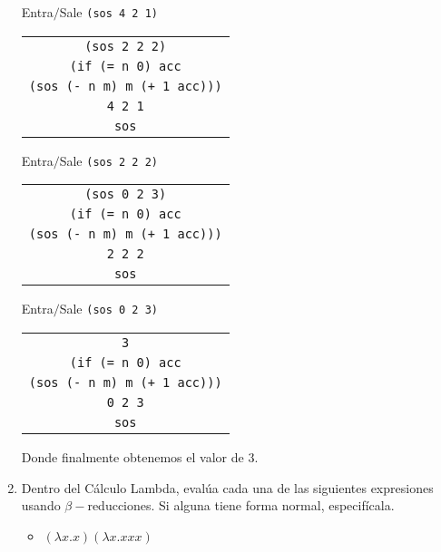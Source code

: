 \documentclass[letterpaper,11pt]{article}
\begin{document}
\begin{enumerate}
    Entra$/$Sale \texttt{(sos 4 2 1)}
    \begin{center}
        \begin{tabular}[h]{|c|}
            \hline
            \texttt{(sos 2 2 2)} \\
            \texttt{(if (= n 0)
                        acc} \\
            \texttt{(sos (- n m) m (+ 1 acc)))} \\ 
            \texttt{4 2 1} \\
            \texttt{sos} \\
            \hline
        \end{tabular}
    \end{center}

    Entra$/$Sale \texttt{(sos 2 2 2)}
    \begin{center}
        \begin{tabular}[h]{|c|}
            \hline
            \texttt{(sos 0 2 3)} \\
            \texttt{(if (= n 0)
                        acc} \\
            \texttt{(sos (- n m) m (+ 1 acc)))} \\ 
            \texttt{2 2 2} \\
            \texttt{sos} \\
            \hline
        \end{tabular}
    \end{center}

    Entra$/$Sale \texttt{(sos 0 2 3)}
    \begin{center}
        \begin{tabular}[h]{|c|}
            \hline
            \texttt{3} \\
            \texttt{(if (= n 0)
                        acc} \\
            \texttt{(sos (- n m) m (+ 1 acc)))} \\ 
            \texttt{0 2 3} \\
            \texttt{sos} \\
            \hline
        \end{tabular}
    \end{center}

    Donde finalmente obtenemos el valor de $3$.

    \item Dentro del Cálculo Lambda, evalúa cada una de las siguientes 
    expresiones usando $\beta -$reducciones. Si alguna tiene forma normal, 
    especifícala.
    \begin{itemize}
        \item $(\lambda x.x)(\lambda x.xxx)$
        

\end{itemize}
\end{enumerate}
\end{document}
